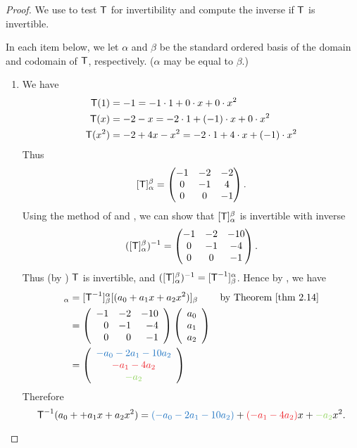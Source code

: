 \begin{proof}
We use  to test \(\textsf{T}\) for invertibility and compute the inverse if \(\textsf{T}\) is invertible.

In each item below, we let \(\alpha\) and \(\beta\) be the standard ordered basis of the domain and codomain of \(\textsf{T}\), respectively.
(\(\alpha\) may be equal to \(\beta\).)

\begin{enumerate}
\item
We have
\begin{align*}
    \textsf{T}(1) & = -1 = -1 \cdot 1 + 0 \cdot x + 0 \cdot x^2 \\
    \textsf{T}(x) & = -2 - x = -2 \cdot 1 + (-1) \cdot x + 0 \cdot x^2 \\
    \textsf{T}(x^2) & = -2 + 4x - x^2 = -2 \cdot 1 + 4 \cdot x + (-1) \cdot x^2
\end{align*}
Thus
\[
    [\textsf{T}]_{\alpha}^{\beta} = \begin{pmatrix}
        -1 & -2 & -2 \\ 0 & -1 & 4 \\ 0 & 0 & -1
    \end{pmatrix}.
\]
Using the method of  and , we can show that \([\textsf{T}]_{\alpha}^{\beta}\) is invertible with inverse
\[
    ([\textsf{T}]_{\alpha}^{\beta})^{-1} = \begin{pmatrix}
        -1 & -2 & -10 \\ 0 & -1 & -4 \\ 0 & 0 & -1
    \end{pmatrix}.
\]
Thus (by ) \(\textsf{T}\) is invertible, and \(([\textsf{T}]_{\alpha}^{\beta})^{-1} = [\textsf{T}^{-1}]_{\beta}^{\alpha}\).
Hence by , we have
\begin{align*}
    [\T^{-1}(a_0 + a_1 x + a_2 x^2)]_{\alpha}
        & = [\T^{-1}]_{\beta}^{\alpha} [(a_0 + a_1 x + a_2 x^2)]_{\beta} & \text{by \THM{2.14}} \\
        & = \left(\begin{array}{rrr}
                -1 & -2 & -10 \\
                0 & -1 & -4 \\
                0 & 0 & -1
            \end{array}\right)
            \left(\begin{array}{l}
                a_0 \\ a_1 \\ a_2
            \end{array}\right) \\
        & = \left(\begin{array}{c}
                \BLUE{-a_0 - 2a_1 - 10a_2} \\ \RED{-a_1 - 4a_2} \\ \GREEN{-a_2}
            \end{array}\right)
\end{align*}
Therefore
\[
    \T^{-1}(a_0 + + a_1 x + a_2 x^2) = \BLUE{(-a_0 - 2a_1 - 10a_2)} + \RED{(-a_1 - 4a_2)} x + \GREEN{-a_2} x^2.
\]


\end{enumerate}
\end{proof}

